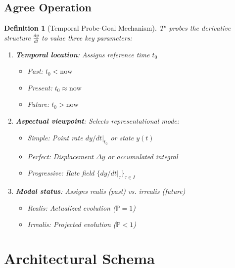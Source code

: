 \documentclass[11pt]{article}
\theoremstyle{defstyle}
\newtheorem{definition}{Definition}[section]
\theoremstyle{mapstyle}
\begin{document}
\subsection{Agree Operation}

\begin{definition}[Temporal Probe-Goal Mechanism]
T$^\circ$ probes the derivative structure $\frac{dy}{dt}$ to value three key parameters:

\begin{enumerate}
\item \textbf{Temporal location}: Assigns reference time $t_0$
    \begin{itemize}
    \item Past: $t_0 < \text{now}$
    \item Present: $t_0 \approx \text{now}$
    \item Future: $t_0 > \text{now}$
    \end{itemize}
    
\item \textbf{Aspectual viewpoint}: Selects representational mode:
    \begin{itemize}
    \item Simple: Point rate $dy/dt|_{t_0}$ or state $y(t)$
    \item Perfect: Displacement $\Delta y$ or accumulated integral
    \item Progressive: Rate field $\{dy/dt|_\tau\}_{\tau \in I}$
    \end{itemize}
    
\item \textbf{Modal status}: Assigns realis (past) vs. irrealis (future)
    \begin{itemize}
    \item Realis: Actualized evolution ($\mathbb{P}=1$)
    \item Irrealis: Projected evolution ($\mathbb{P}<1$)
    \end{itemize}
\end{enumerate}
\end{definition}

\vspace{2\baselineskip}

\section{Architectural Schema}
\end{document}

